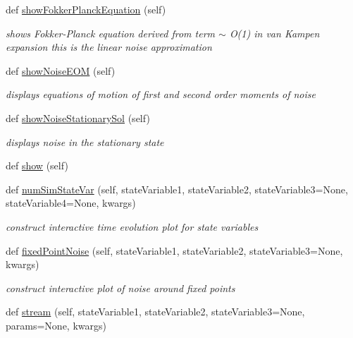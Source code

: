 \begin{DoxyCompactItemize}
def \hyperlink{class_mu_mo_t_1_1_mu_mo_t_1_1_mu_mo_tmodel_a999055f8c8e7e3107eb127e2a3122100}{show\+Fokker\+Planck\+Equation} (self)
\begin{DoxyCompactList}\small\item\em shows Fokker-\/\+Planck equation derived from term $\sim$ O(1) in van Kampen expansion this is the linear noise approximation \end{DoxyCompactList}\item 
def \hyperlink{class_mu_mo_t_1_1_mu_mo_t_1_1_mu_mo_tmodel_a44e2cab71795814aac670b94182ff064}{show\+Noise\+E\+OM} (self)
\begin{DoxyCompactList}\small\item\em displays equations of motion of first and second order moments of noise \end{DoxyCompactList}\item 
def \hyperlink{class_mu_mo_t_1_1_mu_mo_t_1_1_mu_mo_tmodel_a13c400d0d33921d51d4b27e7a52e3ee0}{show\+Noise\+Stationary\+Sol} (self)
\begin{DoxyCompactList}\small\item\em displays noise in the stationary state \end{DoxyCompactList}\item 
def \hyperlink{class_mu_mo_t_1_1_mu_mo_t_1_1_mu_mo_tmodel_ab4f4398c3f210fe4ea6e720401357691}{show} (self)
\item 
def \hyperlink{class_mu_mo_t_1_1_mu_mo_t_1_1_mu_mo_tmodel_a9e0c203e97f89240cb7d6635c893cc7b}{num\+Sim\+State\+Var} (self, state\+Variable1, state\+Variable2, state\+Variable3=None, state\+Variable4=None, kwargs)
\begin{DoxyCompactList}\small\item\em construct interactive time evolution plot for state variables \end{DoxyCompactList}\item 
def \hyperlink{class_mu_mo_t_1_1_mu_mo_t_1_1_mu_mo_tmodel_a7d1753df12ca6dff0b250bdd8f9334a4}{fixed\+Point\+Noise} (self, state\+Variable1, state\+Variable2, state\+Variable3=None, kwargs)
\begin{DoxyCompactList}\small\item\em construct interactive plot of noise around fixed points \end{DoxyCompactList}\item 
def \hyperlink{class_mu_mo_t_1_1_mu_mo_t_1_1_mu_mo_tmodel_aaf3b4e03fc25612260987fe724e52f72}{stream} (self, state\+Variable1, state\+Variable2, state\+Variable3=None, params=None, kwargs)

\end{DoxyCompactItemize}

